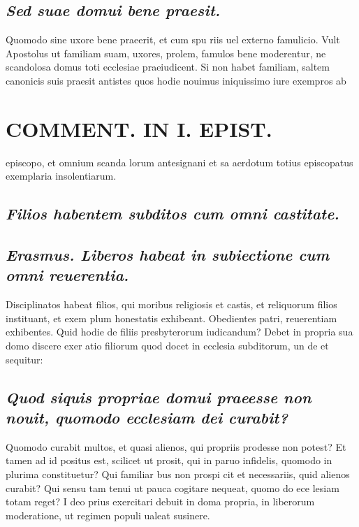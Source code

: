\documentclass{article}
\begin{document}
\begin{pages}
\subsection*{\textit{Sed suae domui bene praesit. }}\pstart Quomodo sine uxore bene praeerit, et cum spu riis uel externo famulicio. Vult Apostolus ut familiam suam, uxores, prolem, famulos bene moderentur, ne scandolosa domus toti ecclesiae praeiudicent. Si non habet familiam, saltem canonicis suis praesit antistes quos hodie nouimus iniquissimo iure exempros ab  \pend
\section*{COMMENT. IN I. EPIST. }
\marginpar{[ p.78 ]}\pstart episcopo, et omnium scanda lorum antesignani et sa aerdotum totius episcopatus exemplaria insolentiarum.  \pend
{}
{}
\subsection*{\textit{Filios habentem subditos cum omni castitate. }}
{}
\subsection*{\textit{Erasmus. Liberos habeat in subiectione cum omni reuerentia. }}\pstart Disciplinatos habeat filios, qui moribus religiosis et castis, et reliquorum filios instituant, et exem plum honestatis exhibeant. Obedientes patri, reuerentiam exhibentes. Quid hodie de filiis presbyterorum iudicandum? Debet in propria sua domo discere exer atio filiorum quod docet in ecclesia subditorum, un de et sequitur:  \pend
{}
{}
\subsection*{\textit{Quod siquis propriae domui praeesse non nouit, quomodo ecclesiam dei curabit? }}\pstart Quomodo curabit multos, et quasi alienos, qui propriis prodesse non potest? Et tamen ad id positus est, scilicet ut prosit, qui in paruo infidelis, quomodo in plurima constituetur? Qui familiar bus non prospi cit et necessariis, quid alienos curabit? Qui sensu tam tenui ut pauca cogitare nequeat, quomo do ece lesiam totam reget? I deo prius exercitari debuit in doma propria, in liberorum moderatione, ut regimen populi ualeat susinere.  \pend

\end{pages}
\end{document}
